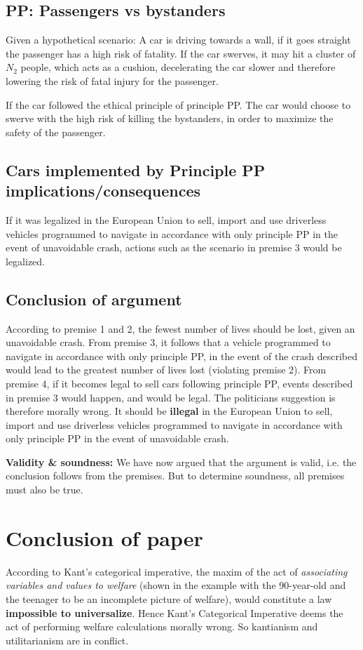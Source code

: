 \subsection{PP: Passengers vs bystanders}
Given a hypothetical scenario: A car is driving towards a wall, if it goes straight the passenger has a high risk of fatality. If the car swerves, it may hit a cluster of $N_2$ people, which acts as a cushion, decelerating the car slower and therefore lowering the risk of fatal injury for the passenger.

If the car followed the ethical principle of principle PP. The car would choose to swerve with the high risk of killing the bystanders, in order to maximize the safety of the passenger.

\subsection{Cars implemented by Principle PP implications/consequences}
If it was legalized in the European Union to sell, import and use driverless vehicles programmed to navigate in accordance with only principle PP in the event of unavoidable crash, actions such as the scenario in premise 3 would be legalized. 


\subsection{Conclusion of argument}
According to premise 1 and 2, the fewest number of lives should be lost, given an unavoidable crash.
From premise 3, it follows that a vehicle programmed to navigate in accordance with only principle PP, in the event of the crash described would lead to the greatest number of lives lost (violating premise 2). From premise 4, if it becomes legal to sell cars following principle PP, events described in premise 3 would happen, and would be legal.
The politicians suggestion is therefore morally wrong.
It should be \textbf{illegal} in the European Union to sell, import and use driverless vehicles programmed to navigate in accordance with only principle PP in the event of unavoidable crash. 

\textbf{Validity \& soundness:} We have now argued that the argument is valid, i.e. the conclusion follows from the premises. But to determine soundness, all premises must also be true. 

\section{Conclusion of paper}
According to Kant's categorical imperative, the maxim of the act of \textit{associating variables and values to welfare} 
(shown in the example with the 90-year-old and the teenager to be an incomplete picture of welfare), would constitute a law \textbf{impossible to universalize}. Hence Kant's Categorical Imperative deems the act of performing welfare calculations morally wrong. So kantianism and utilitarianism are in conflict.


